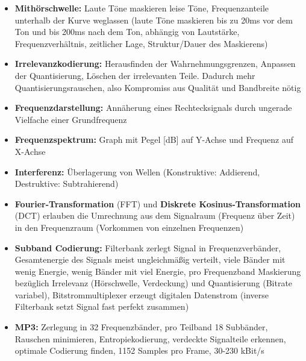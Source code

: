 \documentclass[12pt,landscape]{article}
\begin{document}
\begin{multicols}{3}
\begin{itemize}
\item \textbf{Mithörschwelle:} Laute Töne maskieren leise Töne, Frequenzanteile unterhalb der Kurve weglassen (laute Töne maskieren bis zu 20ms vor dem Ton und bis 200ms nach dem Ton, abhängig von Lautstärke, Frequenzverhältnis, zeitlicher Lage, Struktur/Dauer des Maskierens)
\item \textbf{Irrelevanzkodierung:} Herausfinden der Wahrnehmungsgrenzen, Anpassen der Quantisierung, Löschen der irrelevanten Teile. Dadurch mehr Quantisierungsrauschen, also Kompromiss aus Qualität und Bandbreite nötig
\item \textbf{Frequenzdarstellung:} Annäherung eines Rechtecksignals durch ungerade Vielfache einer Grundfrequenz
\item \textbf{Frequenzspektrum:} Graph mit Pegel [dB] auf Y-Achse und Frequenz auf X-Achse
\item \textbf{Interferenz:} Überlagerung von Wellen (Konstruktive: Addierend, Destruktive: Subtrahierend)
\item \textbf{Fourier-Transformation} (FFT) und \textbf{Diskrete Kosinus-Transformation} (DCT) erlauben die Umrechnung aus dem Signalraum (Frequenz über Zeit) in den Frequenzraum (Vorkommen von einzelnen Frequenzen)
\item \textbf{Subband Codierung:} Filterbank zerlegt Signal in Frequenzverbänder, Gesamtenergie des Signals meist ungleichmäßig verteilt, viele Bänder mit wenig Energie, wenig Bänder mit viel Energie, pro Frequenzband Maskierung bezüglich Irrelevanz (Hörschwelle, Verdeckung) und Quantisierung (Bitrate variabel), Bitstrommultiplexer erzeugt digitalen Datenstrom (inverse Filterbank setzt Signal fast perfekt zusammen)
\item \textbf{MP3:} Zerlegung in 32 Frequenzbänder, pro Teilband 18 Subbänder, Rauschen minimieren, Entropiekodierung, verdeckte Signalteile erkennen, optimale Codierung finden, 1152 Samples pro Frame, 30-230 kBit/s

\end{itemize}
\end{multicols}
\end{document}

